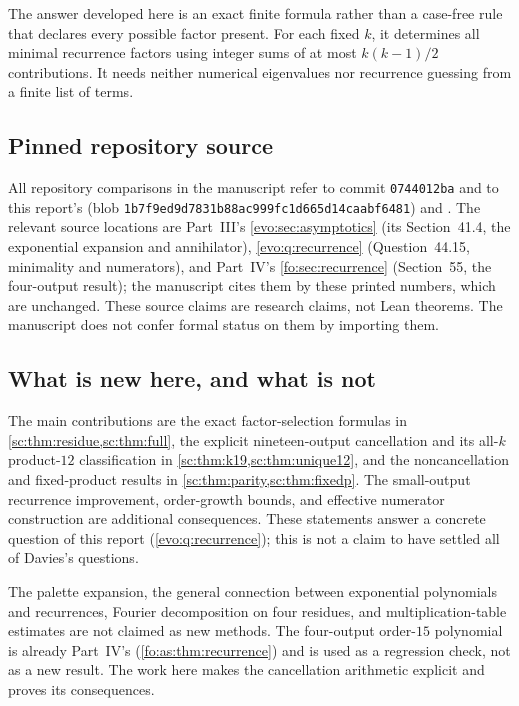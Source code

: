 \documentclass[11pt,a4paper]{article}
\numberwithin{equation}{section}
\theoremstyle{definition}
\theoremstyle{remark}
\begin{document}
The answer developed here is an exact finite formula rather than a
case-free rule that declares every possible factor present. For each fixed
$k$, it determines all minimal recurrence factors using integer sums of at
most $k(k-1)/2$ contributions. It needs neither numerical eigenvalues nor
recurrence guessing from a finite list of terms.

\subsection{Pinned repository source}
All repository comparisons in the manuscript refer to commit
\texttt{0744012ba} and to this report's  (blob
\texttt{1b7f9ed9d7831b88ac999fc1d665d14caabf6481}) and
. The relevant source locations are Part~III's
\cref{evo:sec:asymptotics} (its Section~41.4, the exponential expansion
and annihilator), \cref{evo:q:recurrence} (Question~44.15, minimality and
numerators), and Part~IV's \cref{fo:sec:recurrence} (Section~55, the
four-output result); the manuscript cites them by these printed numbers,
which are unchanged. These source claims are research claims, not Lean
theorems. The manuscript does not confer formal status on them by importing
them.

\subsection{What is new here, and what is not}
The main contributions are the exact factor-selection formulas in
\cref{sc:thm:residue,sc:thm:full}, the explicit nineteen-output cancellation and
its all-$k$ product-$12$ classification in \cref{sc:thm:k19,sc:thm:unique12}, and the
noncancellation and fixed-product results in
\cref{sc:thm:parity,sc:thm:fixedp}. The small-output recurrence improvement,
order-growth bounds, and effective numerator construction are additional
consequences. These statements answer a concrete question of this report
(\cref{evo:q:recurrence}); this is not a claim to have settled all of
Davies's questions.

The palette expansion, the general connection between exponential
polynomials and recurrences, Fourier decomposition on four residues, and
multiplication-table estimates are not claimed as new methods. The
four-output order-$15$ polynomial is already Part~IV's
(\cref{fo:as:thm:recurrence}) and is used as a regression check, not as a
new result. The work here makes the cancellation arithmetic explicit and
proves its consequences.
\end{document}
